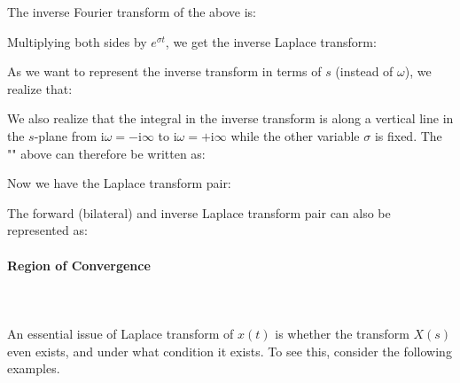	The inverse Fourier transform of the above is:
	
	Multiplying both sides by $e^{\sigma t}$, we get the inverse Laplace transform:
	
	As we want to represent the inverse transform in terms of $s$ (instead of $\omega$), we realize that:
	
	We also realize that the integral in the inverse transform is along a vertical line in the $s$-plane from $\mathrm{i}\omega=-\mathrm{i}\infty$ to $\mathrm{i}\omega=+\mathrm{i}\infty$ while the other variable $\sigma$ is fixed. The "" above can therefore be written as:
	
	Now we have the Laplace transform pair:
	
	
	The forward (bilateral) and inverse Laplace transform pair can also be represented as:
	
	
	\pagebreak
	\paragraph{Region of Convergence}\mbox{}\\\\
	An essential issue of Laplace transform of $x(t)$ is whether the transform $X(s)$ even exists, and under what condition it exists. To see this, consider the following examples.
	

